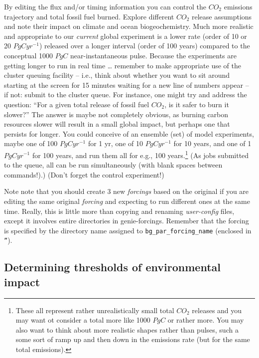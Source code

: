 \documentclass[11pt,fleqn]{book} %
\begin{document}
By editing the flux and/or timing information you can control the \(CO_{2}\) emissions trajectory and total fossil fuel burned. Explore different \(CO_{2}\) release assumptions and note their impact on climate and ocean biogeochemistry. Much more realistic and appropriate to our \textit{current} global experiment is a lower rate (order of 10 or 20 \(PgCyr^{-1}\)) released over a longer interval (order of 100 years) compared to the conceptual 1000 \(PgC\) near-instantaneous pulse. Because the experiments are getting longer to run in real time … remember to make appropriate use of the cluster queuing facility – i.e., think about whether you want to sit around starting at the screen for 15 minutes waiting for a new line of numbers appear – if not: submit to the cluster queue. For instance, one might try and address the question: “For a given total release of  fossil fuel \(CO_{2}\), is it safer to burn it slower?” The answer is maybe not completely obvious, as burning carbon resources slower will result in a small global impact, but perhaps one that persists for longer. You could conceive of an ensemble (set) of model experiments, maybe one of 100 \(PgCyr^{-1}\) for 1 yr, one of 10 \(PgCyr^{-1}\) for 10 years, and one of 1 \(PgCyr^{-1}\) for 100 years, and run them all for e.g., 100 years.\footnote{These all represent rather unrealistically small total \(CO_{2}\) releases and you may want ot consider a total more like 1000 \(PgC\) or rather more. You may also want to think about more realistic shapes rather than pulses, such a some sort of ramp up and then down in the emissions rate (but for the same total emissions).} (As jobs submitted to the queue, all can be run simultaneously (with blank spaces between commands!).) (Don’t forget the control experiment!) 

Note note that you should create 3 new \textit{forcings} based on the original if you are editing the same original  \textit{forcing} and expecting to run different ones at the same time. Really, this is little more than copying and renaming \textit{user-config} files, except it involves entire directories in genie-forcings. Remember that the forcing is specified by the directory name assigned to \texttt{bg\_par\_forcing\_name} (enclosed in \texttt{''}).


\subsection{Determining thresholds of environmental impact}
\end{document}
